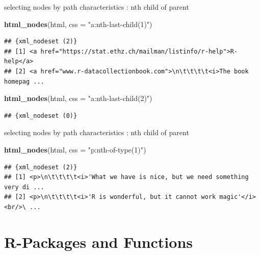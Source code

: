 \documentclass[ignorenonframetext,]{beamer}
\newenvironment{Shaded}{\begin{snugshade}}{\end{snugshade}}
\newcommand{\KeywordTok}[1]{\textcolor[rgb]{0.13,0.29,0.53}{\textbf{{#1}}}}
\newcommand{\DataTypeTok}[1]{\textcolor[rgb]{0.13,0.29,0.53}{{#1}}}
\newcommand{\StringTok}[1]{\textcolor[rgb]{0.31,0.60,0.02}{{#1}}}
\newcommand{\NormalTok}[1]{{#1}}
\begin{document}
\begin{frame}[fragile]{selecting nodes by path characteristics : nth
child of parent}

\begin{Shaded}
\begin{Highlighting}[]
\KeywordTok{html_nodes}\NormalTok{(html, }\DataTypeTok{css =} \StringTok{"a:nth-last-child(1)"}\NormalTok{)}
\end{Highlighting}
\end{Shaded}

\begin{verbatim}
## {xml_nodeset (2)}
## [1] <a href="https://stat.ethz.ch/mailman/listinfo/r-help">R-help</a>
## [2] <a href="www.r-datacollectionbook.com">\n\t\t\t\t<i>The book homepag ...
\end{verbatim}

\begin{Shaded}
\begin{Highlighting}[]
\KeywordTok{html_nodes}\NormalTok{(html, }\DataTypeTok{css =} \StringTok{"a:nth-last-child(2)"}\NormalTok{)}
\end{Highlighting}
\end{Shaded}

\begin{verbatim}
## {xml_nodeset (0)}
\end{verbatim}

\end{frame}

\begin{frame}[fragile]{selecting nodes by path characteristics : nth
child of parent}

\begin{Shaded}
\begin{Highlighting}[]
\KeywordTok{html_nodes}\NormalTok{(html, }\DataTypeTok{css =} \StringTok{"p:nth-of-type(1)"}\NormalTok{)}
\end{Highlighting}
\end{Shaded}

\begin{verbatim}
## {xml_nodeset (2)}
## [1] <p>\n\t\t\t\t<i>'What we have is nice, but we need something very di ...
## [2] <p>\n\t\t\t\t<i>'R is wonderful, but it cannot work magic'</i><br/>\ ...
\end{verbatim}

\end{frame}

\section{R-Packages and Functions}\label{r-packages-and-functions}
\end{document}
